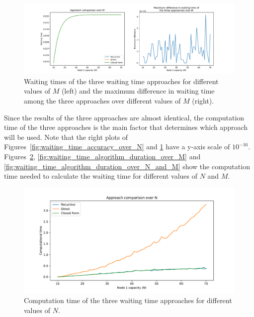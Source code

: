 \begin{figure}[H]
    \includegraphics[width=\textwidth]{chapters/03_queueing_model/img/numeric_results_and_timings/waiting_time_formulas_comparison/waiting_time_over_M.pdf}
    \caption{Waiting times of the three waiting time approaches for different
    values of \(M\) (left) and the maximum difference in waiting time among
    the three approaches over different values of \(M\) (right).}
    \label{fig:waiting_time_accuracy_over_M}
\end{figure}


Since the results of the three approaches are almost identical, the computation
time of the three approaches is the main factor that determines which
approach will be used.
Note that the right plots of Figures~\ref{fig:waiting_time_accuracy_over_N} and
\ref{fig:waiting_time_accuracy_over_M} have a y-axis scale of \(10^{-16}\).
Figures~\ref{fig:waiting_time_algorithm_duration_over_N},
\ref{fig:waiting_time_algorithm_duration_over_M} and
\ref{fig:waiting_time_algorithm_duration_over_N_and_M} show the computation
time needed to calculate the waiting time for different values of \(N\) and
\(M\).

\begin{figure}[H]
    \includegraphics[width=\textwidth]{chapters/03_queueing_model/img/numeric_results_and_timings/waiting_time_formulas_comparison/algorithm_duration_over_N.pdf}
    \caption{Computation time of the three waiting time approaches for different values
    of \(N\).}
    \label{fig:waiting_time_algorithm_duration_over_N}
\end{figure}

